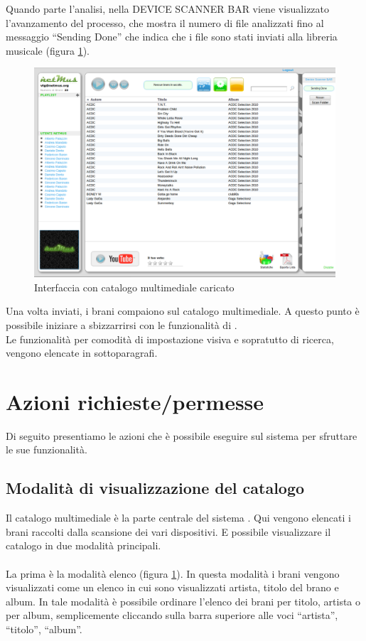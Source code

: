 Quando parte l'analisi, nella DEVICE SCANNER BAR viene visualizzato
l'avanzamento del processo, che mostra il numero di file analizzati fino al
messaggio ``Sending Done'' che indica che i file sono stati inviati alla
libreria musicale (figura \ref{fig:fineUpload}).
\begin{figure}[!htbp]
  \centering
  \includegraphics[width=14cm]{img/MU/song_loaded.png}
\caption{Interfaccia con catalogo multimediale caricato}
\label{fig:fineUpload}
\end{figure}

Una volta inviati, i brani compaiono sul catalogo multimediale.
A questo punto \`e possibile iniziare a sbizzarrirsi con le funzionalit\`a di
.\\

Le funzionalit\`a per comodit\`a di impostazione visiva e
sopratutto di ricerca, vengono elencate in sottoparagrafi.

\newpage
\section{Azioni richieste/permesse}
Di seguito presentiamo le azioni che \`e possibile eseguire sul sistema per
sfruttare le sue funzionalit\`a.

\subsection{Modalit\`a di visualizzazione del catalogo}
Il catalogo multimediale \`e la parte centrale del sistema . Qui
vengono elencati i brani raccolti dalla scansione dei vari dispositivi. E
possibile visualizzare il catalogo in due modalit\`a principali.\\
\\
La prima \`e la modalit\`a elenco (figura \ref{fig:fineUpload}). In questa
modalit\`a i brani vengono visualizzati come un elenco in cui sono visualizzati artista, titolo del brano e
album. In tale modalit\`a \`e possibile ordinare l'elenco dei brani per titolo,
artista o per album, semplicemente cliccando sulla barra superiore alle voci
``artista'', ``titolo'', ``album''.\\

